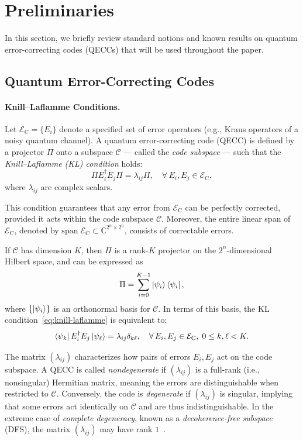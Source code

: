 \documentclass[8pt]{article}
\theoremstyle{definition}
\newcommand{\code}{\mathcal{C}}
\newcommand{\proj}{\Pi}
\newcommand{\ecset}{\mathcal{E}_\textrm{C}}
\begin{document}
\section{Preliminaries}\label{pre}

In this section, we briefly review standard notions and known results on quantum error-correcting codes (QECCs) that will be used throughout the paper.


\subsection{Quantum Error-Correcting Codes}

\paragraph{Knill--Laflamme Conditions.}
Let \(\ecset = \{E_i\}\) denote a specified set of error operators (e.g., Kraus operators of a noisy quantum channel). A quantum error-correcting code (QECC) is defined by a projector \(\proj\) onto a subspace \(\code\) --- called the \emph{code subspace} --- such that the \emph{Knill--Laflamme (KL) condition} holds:
\begin{equation}
    \proj E_i^\dagger E_j \proj = \lambda_{ij} \proj,
    \quad \forall\, E_i, E_j \in \ecset,
    \label{eq:knill-laflamme}
\end{equation}
where \(\lambda_{ij}\) are complex scalars.

This condition guarantees that any error from \(\ecset\) can be perfectly corrected, provided it acts within the code subspace \(\code\). Moreover, the entire linear span of \(\ecset\), denoted by \(\mathrm{span}\;\ecset \subset \mathbb{C}^{2^n \times 2^n}\), consists of correctable errors.

If \(\code\) has dimension \(K\), then \(\proj\) is a rank-\(K\) projector on the \(2^n\)-dimensional Hilbert space, and can be expressed as
\[
    \proj = \sum_{i=0}^{K-1} \ket{\psi_i}\bra{\psi_i},
\]
where \(\{\ket{\psi_i}\}\) is an orthonormal basis for \(\code\). In terms of this basis, the KL condition~\eqref{eq:knill-laflamme} is equivalent to:
\begin{equation}
    \bra{\psi_k} E_i^\dagger E_j \ket{\psi_\ell} = \lambda_{ij} \delta_{k\ell},
    \quad \forall\, E_i, E_j \in \ecset,\; 0 \le k,\ell < K.
    \label{eq:knill-laflamme2}
\end{equation}

The matrix \((\lambda_{ij})\) characterizes how pairs of errors \(E_i, E_j\) act on the code subspace. A QECC is called \emph{nondegenerate} if \((\lambda_{ij})\) is a full-rank (i.e., nonsingular) Hermitian matrix, meaning the errors are distinguishable when restricted to \(\code\). Conversely, the code is \emph{degenerate} if \((\lambda_{ij})\) is singular, implying that some errors act identically on \(\code\) and are thus indistinguishable. In the extreme case of \emph{complete degeneracy}, known as a \emph{decoherence-free subspace} (DFS), the matrix \((\lambda_{ij})\) may have rank \(1\)~\cite{lidar1998decoherence,lidar2003decoherence}.
\end{document}

